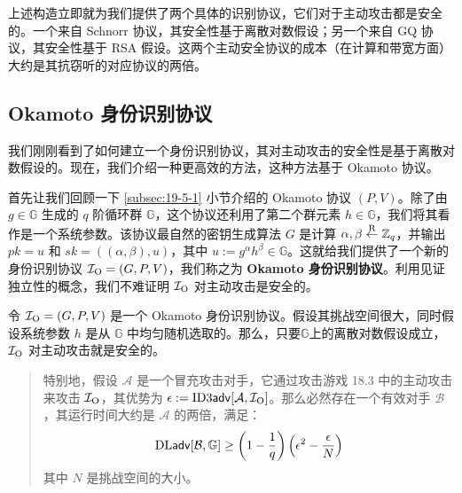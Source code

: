 \begin{snote}[具体的实例化.]
	上述构造立即就为我们提供了两个具体的识别协议，它们对于主动攻击都是安全的。一个来自 Schnorr 协议，其安全性基于离散对数假设；另一个来自 GQ 协议，其安全性基于 RSA 假设。这两个主动安全协议的成本（在计算和带宽方面）大约是其抗窃听的对应协议的两倍。
\end{snote}

\subsection{Okamoto 身份识别协议}

我们刚刚看到了如何建立一个身份识别协议，其对主动攻击的安全性是基于离散对数假设的。现在，我们介绍一种更高效的方法，这种方法基于 Okamoto 协议。

首先让我们回顾一下 \ref{subsec:19-5-1} 小节介绍的 Okamoto 协议 $(P,V)$。除了由 $g\in\mathbb{G}$ 生成的 $q$ 阶循环群 $\mathbb{G}$，这个协议还利用了第二个群元素 $h\in\mathbb{G}$，我们将其看作是一个系统参数。该协议最自然的密钥生成算法 $G$ 是计算 $\alpha,\beta\overset{\rm R}\leftarrow\mathbb{Z}_q$，并输出 $pk=u$ 和 $sk=((\alpha,\beta),u)$，其中 $u:=g^\alpha h^\beta\in\mathbb{G}$。这就给我们提供了一个新的身份识别协议 $\mathcal{I}_{\rm O}=(G,P,V)$，我们称之为 \textbf{Okamoto 身份识别协议}。利用见证独立性的概念，我们不难证明 $\mathcal{I}_{\rm O}$ 对主动攻击是安全的。

\begin{theorem}\label{theo:19-23}
令 $\mathcal{I}_{\rm O}=(G,P,V)$ 是一个 Okamoto 身份识别协议。假设其挑战空间很大，同时假设系统参数 $h$ 是从 $\mathbb{G}$ 中均匀随机选取的。那么，只要$\mathbb{G}$上的离散对数假设成立，$\mathcal{I}_{\rm O}$ 对主动攻击就是安全的。
\begin{quote}
特别地，假设 $\mathcal{A}$ 是一个冒充攻击对手，它通过攻击游戏 18.3 中的主动攻击来攻击 $\mathcal{I}_{\rm O}$，其优势为 $\epsilon:={\rm ID3\mathsf{adv}}[\mathcal{A},\mathcal{I}_{\rm O}]$。那么必然存在一个有效对手 $\mathcal{B}$，其运行时间大约是 $\mathcal{A}$ 的两倍，满足：
\[
{\rm DL\mathsf{adv}}[\mathcal{B},\mathbb{G}]\geq\left(1-\frac{1}{q}\right)\left(\epsilon^2-\frac{\epsilon}{N}\right)
\]
其中 $N$ 是挑战空间的大小。
\end{quote}
\end{theorem}

